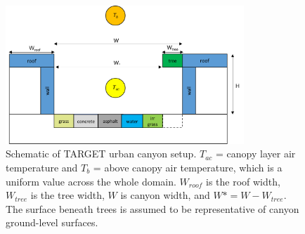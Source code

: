 \documentclass[journal abbreviation, manuscript]{copernicus}
\begin{document}
\begin{figure}[!htbp]
\begin{center}

\includegraphics[width=0.8\textwidth,keepaspectratio]{figure2.png}

\caption{Schematic of TARGET urban canyon setup. $T_{ac}$ = canopy layer air temperature and \ensuremath{T_{b}} = above canopy air temperature, which is a uniform value across the whole domain. $W_{roof}$ is the roof width, $W_{tree}$ is the tree width, $W$ is canyon width, and $W* = W - W_{tree}$. The surface beneath trees is assumed to be representative of  canyon ground-level surfaces. } \label{fig:canyon}
 \end{center}

\end{figure}
\end{document}
